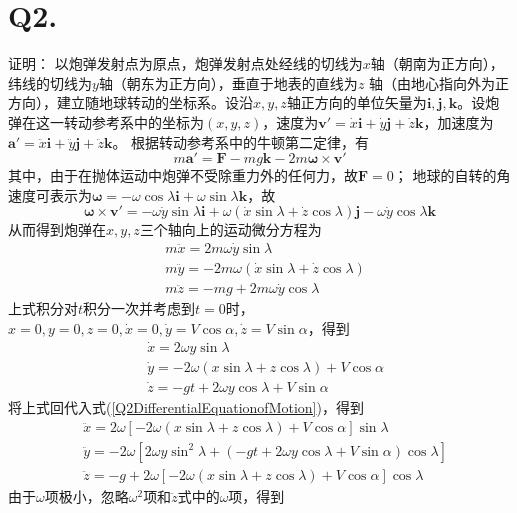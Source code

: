 \documentclass[10pt,a4paper]{article}
\begin{document}
\section*{Q2.}证明：
以炮弹发射点为原点，炮弹发射点处经线的切线为$x$轴（朝南为正方向），纬线的切线为$y$轴（朝东为正方向），垂直于地表的直线为$z$ 轴（由地心指向外为正方向），建立随地球转动的坐标系。设沿$x,y,z$轴正方向的单位矢量为$\bm{i},\bm{j},\bm{k}$。设炮弹在这一转动参考系中的坐标为$(x,y,z)$，速度为$\bm{v}' = \dot{x}\bm{i} + \dot{y}\bm{j} + \dot{z}\bm{k}$，加速度为$\bm{a}' = \ddot{x}\bm{i} + \ddot{y}\bm{j} + \ddot{z}\bm{k}$。 根据转动参考系中的牛顿第二定律，有
\[
m\bm{a}' = \bm{F} - mg\bm{k} - 2m\bm{\omega}\times\bm{v}'
\]
其中，由于在抛体运动中炮弹不受除重力外的任何力，故$\bm{F} = 0$； 地球的自转的角速度可表示为$\bm{\omega} = -\omega\cos\lambda\bm{i} + \omega\sin\lambda\bm{k}$，故
\[
\bm{\omega}\times\bm{v}' = -\omega\dot{y}\sin\lambda\bm{i} + \omega(\dot{x}\sin\lambda + \dot{z}\cos\lambda)\bm{j} - \omega\dot{y}\cos\lambda\bm{k}
\]
从而得到炮弹在$x,y,z$三个轴向上的运动微分方程为
\begin{equation}
\label{Q2DifferentialEquationofMotion}
\begin{split}
&m\ddot{x} = 2m\omega\dot{y}\sin\lambda\\
&m\ddot{y} = -2m\omega(\dot{x}\sin\lambda + \dot{z}\cos\lambda)\\
&m\ddot{z} = -mg + 2m\omega\dot{y}\cos\lambda
\end{split}
\end{equation}
上式积分对$t$积分一次并考虑到$t = 0$时，$x = 0, y = 0, z = 0, \dot{x} = 0, \dot{y} = V\cos\alpha, \dot{z} = V\sin\alpha$，得到
\begin{align*}
&\dot{x} = 2\omega y\sin\lambda\\
&\dot{y} = -2\omega(x\sin\lambda + z\cos\lambda) + V\cos\alpha\\
&\dot{z} = -gt + 2\omega y\cos\lambda + V\sin\alpha
\end{align*}
将上式回代入式(\ref{Q2DifferentialEquationofMotion})，得到
\begin{align*}
&\ddot{x} = 2\omega[-2\omega(x\sin\lambda + z\cos\lambda) + V\cos\alpha]\sin\lambda\\
&\ddot{y} = -2\omega[2\omega y\sin^2\lambda + (-gt + 2\omega y\cos\lambda + V\sin\alpha)\cos\lambda]\\
&\ddot{z} = -g + 2\omega[-2\omega(x\sin\lambda + z\cos\lambda) + V\cos\alpha]\cos\lambda
\end{align*}
由于$\omega$项极小，忽略$\omega^2$项和$\ddot{z}$式中的$\omega$项，得到
\end{document}
